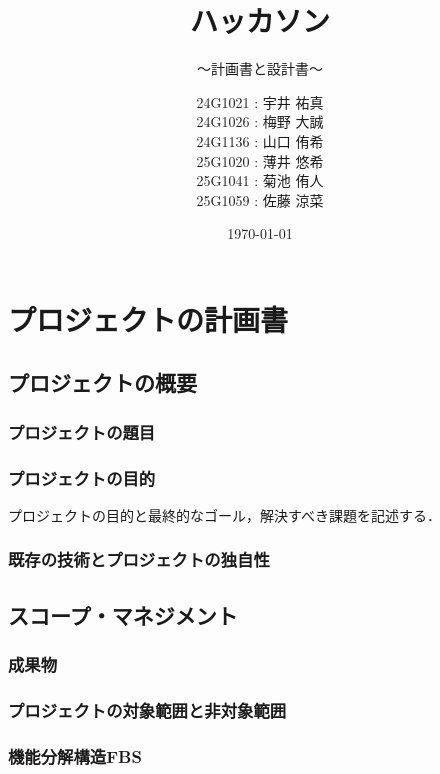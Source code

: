 \documentclass[lualatex,book,paper=a4paper,jafontsize=11.5pt,jafontscale=1.05]{jlreq}
\title{ハッカソン}
\subtitle{～計画書と設計書～}
\author{
	24G1021 : 宇井 祐真\\
        24G1026 : 梅野 大誠\\
	24G1136 : 山口 侑希 \\
        25G1020 : 薄井 悠希\\
        25G1041 : 菊池 侑人\\
        25G1059 : 佐藤 涼菜  
        }
\date{\today}
\begin{document}
\maketitle

\setcounter{tocdepth}{2}
\tableofcontents \thispagestyle{empty}

\chapter{プロジェクトの計画書} \label{chap:project-plan}\setcounter{page}{1}


\section{プロジェクトの概要}
\subsection{プロジェクトの題目}

\subsection{プロジェクトの目的}
プロジェクトの目的と最終的なゴール，解決すべき課題を記述する．

\subsection{既存の技術とプロジェクトの独自性}

\section{スコープ・マネジメント}
\subsection{成果物}

\subsection{プロジェクトの対象範囲と非対象範囲}

\subsection{機能分解構造FBS}
\end{document}
